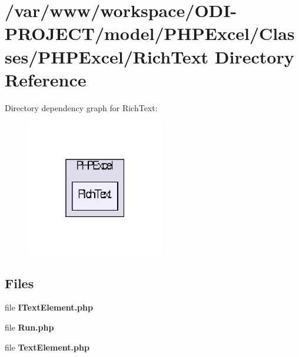 \section{/var/www/workspace/\+O\+D\+I-\/\+P\+R\+O\+J\+E\+C\+T/model/\+P\+H\+P\+Excel/\+Classes/\+P\+H\+P\+Excel/\+Rich\+Text Directory Reference}
\label{dir_d6ae2e1418abee576b800910de5a5b4d}
Directory dependency graph for Rich\+Text\+:\nopagebreak
\begin{figure}[H]
\begin{center}
\leavevmode
\includegraphics[width=170pt]{dir_d6ae2e1418abee576b800910de5a5b4d_dep}
\end{center}
\end{figure}
\subsection*{Files}
\begin{DoxyCompactItemize}
\item 
file {\bfseries I\+Text\+Element.\+php}
\item 
file {\bfseries Run.\+php}
\item 
file {\bfseries Text\+Element.\+php}
\end{DoxyCompactItemize}
